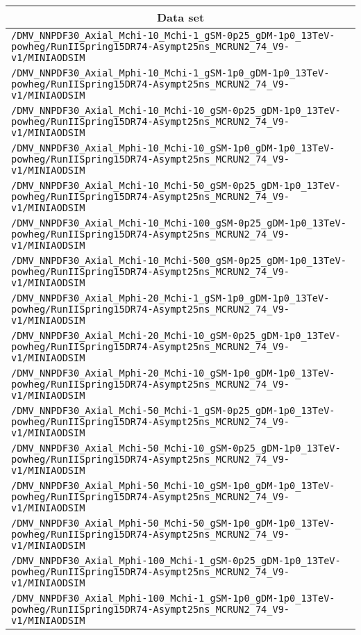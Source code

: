 \begin{center}
\begin{tabular}{l}
\hline\hline
\multicolumn{1}{c}{Data set}\tabularnewline
\hline
\verb!/DMV_NNPDF30_Axial_Mchi-10_Mchi-1_gSM-0p25_gDM-1p0_13TeV-powheg/RunIISpring15DR74-Asympt25ns_MCRUN2_74_V9-v1/MINIAODSIM! \tabularnewline
\verb!/DMV_NNPDF30_Axial_Mphi-10_Mchi-1_gSM-1p0_gDM-1p0_13TeV-powheg/RunIISpring15DR74-Asympt25ns_MCRUN2_74_V9-v1/MINIAODSIM! \tabularnewline
\verb!/DMV_NNPDF30_Axial_Mchi-10_Mchi-10_gSM-0p25_gDM-1p0_13TeV-powheg/RunIISpring15DR74-Asympt25ns_MCRUN2_74_V9-v1/MINIAODSIM! \tabularnewline
\verb!/DMV_NNPDF30_Axial_Mphi-10_Mchi-10_gSM-1p0_gDM-1p0_13TeV-powheg/RunIISpring15DR74-Asympt25ns_MCRUN2_74_V9-v1/MINIAODSIM! \tabularnewline
\verb!/DMV_NNPDF30_Axial_Mchi-10_Mchi-50_gSM-0p25_gDM-1p0_13TeV-powheg/RunIISpring15DR74-Asympt25ns_MCRUN2_74_V9-v1/MINIAODSIM! \tabularnewline
\verb!/DMV_NNPDF30_Axial_Mchi-10_Mchi-100_gSM-0p25_gDM-1p0_13TeV-powheg/RunIISpring15DR74-Asympt25ns_MCRUN2_74_V9-v1/MINIAODSIM! \tabularnewline
\verb!/DMV_NNPDF30_Axial_Mchi-10_Mchi-500_gSM-0p25_gDM-1p0_13TeV-powheg/RunIISpring15DR74-Asympt25ns_MCRUN2_74_V9-v1/MINIAODSIM! \tabularnewline
\verb!/DMV_NNPDF30_Axial_Mphi-20_Mchi-1_gSM-1p0_gDM-1p0_13TeV-powheg/RunIISpring15DR74-Asympt25ns_MCRUN2_74_V9-v1/MINIAODSIM! \tabularnewline
\verb!/DMV_NNPDF30_Axial_Mchi-20_Mchi-10_gSM-0p25_gDM-1p0_13TeV-powheg/RunIISpring15DR74-Asympt25ns_MCRUN2_74_V9-v1/MINIAODSIM! \tabularnewline
\verb!/DMV_NNPDF30_Axial_Mphi-20_Mchi-10_gSM-1p0_gDM-1p0_13TeV-powheg/RunIISpring15DR74-Asympt25ns_MCRUN2_74_V9-v1/MINIAODSIM! \tabularnewline
\verb!/DMV_NNPDF30_Axial_Mchi-50_Mchi-1_gSM-0p25_gDM-1p0_13TeV-powheg/RunIISpring15DR74-Asympt25ns_MCRUN2_74_V9-v1/MINIAODSIM! \tabularnewline
\verb!/DMV_NNPDF30_Axial_Mchi-50_Mchi-10_gSM-0p25_gDM-1p0_13TeV-powheg/RunIISpring15DR74-Asympt25ns_MCRUN2_74_V9-v1/MINIAODSIM! \tabularnewline
\verb!/DMV_NNPDF30_Axial_Mphi-50_Mchi-10_gSM-1p0_gDM-1p0_13TeV-powheg/RunIISpring15DR74-Asympt25ns_MCRUN2_74_V9-v1/MINIAODSIM! \tabularnewline
\verb!/DMV_NNPDF30_Axial_Mphi-50_Mchi-50_gSM-1p0_gDM-1p0_13TeV-powheg/RunIISpring15DR74-Asympt25ns_MCRUN2_74_V9-v1/MINIAODSIM! \tabularnewline
\verb!/DMV_NNPDF30_Axial_Mphi-100_Mchi-1_gSM-0p25_gDM-1p0_13TeV-powheg/RunIISpring15DR74-Asympt25ns_MCRUN2_74_V9-v1/MINIAODSIM! \tabularnewline
\verb!/DMV_NNPDF30_Axial_Mphi-100_Mchi-1_gSM-1p0_gDM-1p0_13TeV-powheg/RunIISpring15DR74-Asympt25ns_MCRUN2_74_V9-v1/MINIAODSIM! \tabularnewline

\end{tabular}
\end{center}
